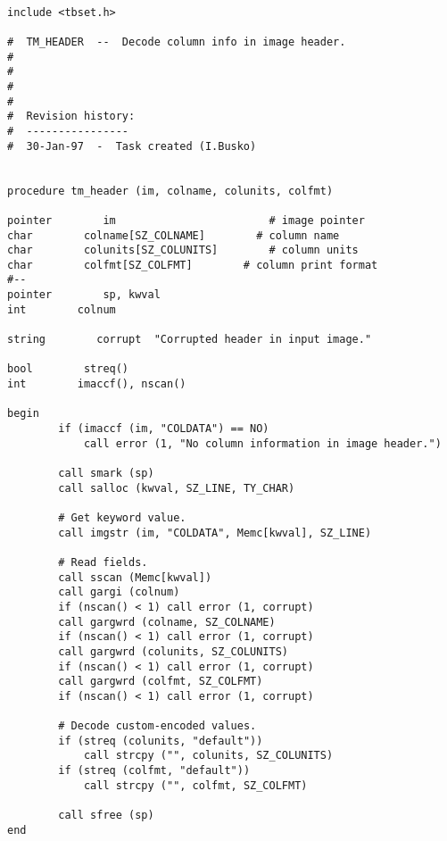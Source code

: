 \begin{verbatim}

include <tbset.h>

#  TM_HEADER  --  Decode column info in image header.
#
#
#
#
#  Revision history:
#  ----------------
#  30-Jan-97  -  Task created (I.Busko)


procedure tm_header (im, colname, colunits, colfmt)

pointer        im                        # image pointer
char        colname[SZ_COLNAME]        # column name        
char        colunits[SZ_COLUNITS]        # column units        
char        colfmt[SZ_COLFMT]        # column print format
#--
pointer        sp, kwval
int        colnum

string        corrupt  "Corrupted header in input image."

bool        streq()
int        imaccf(), nscan()

begin
        if (imaccf (im, "COLDATA") == NO)
            call error (1, "No column information in image header.")

        call smark (sp)
        call salloc (kwval, SZ_LINE, TY_CHAR)

        # Get keyword value.
        call imgstr (im, "COLDATA", Memc[kwval], SZ_LINE)

        # Read fields.
        call sscan (Memc[kwval])
        call gargi (colnum)
        if (nscan() < 1) call error (1, corrupt)
        call gargwrd (colname, SZ_COLNAME) 
        if (nscan() < 1) call error (1, corrupt)
        call gargwrd (colunits, SZ_COLUNITS)
        if (nscan() < 1) call error (1, corrupt)
        call gargwrd (colfmt, SZ_COLFMT)
        if (nscan() < 1) call error (1, corrupt)

        # Decode custom-encoded values.
        if (streq (colunits, "default"))
            call strcpy ("", colunits, SZ_COLUNITS)
        if (streq (colfmt, "default"))
            call strcpy ("", colfmt, SZ_COLFMT)

        call sfree (sp)
end



\end{verbatim}
\newpage
{}
